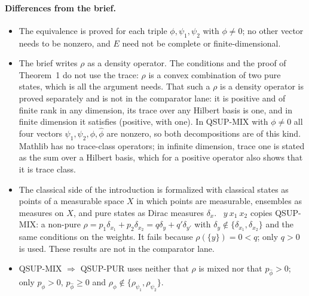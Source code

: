 \documentclass[11pt]{article}
\begin{document}
\paragraph{Differences from the brief.}
\begin{itemize}
\item The equivalence is proved for each triple $\phi, \psi_1, \psi_2$ with $\phi \ne 0$; no
  other vector needs to be nonzero, and $E$ need not be complete or finite-dimensional.
\item The brief writes $\rho$ as a density operator. The conditions and the proof of Theorem~1
  do not use the trace: $\rho$ is a convex combination of two pure states, which is all the
  argument needs. That such a $\rho$ is a density operator is proved separately and is not
  in the comparator lane: it is positive and of finite rank in any dimension, its trace over
  any Hilbert basis is one, and in finite dimension it satisfies  (positive, with
   one). In QSUP-MIX with $\phi \ne 0$ all four vectors $\psi_1, \psi_2,
  \phi, \hat\phi$ are nonzero, so both decompositions are of this kind. Mathlib has no trace-class
  operators; in infinite dimension, trace one is stated as the sum over a Hilbert basis, which
  for a positive operator also shows that it is trace class.
\item The classical side of the introduction is formalized with classical states as points of a
  measurable space $X$ in which points are measurable, ensembles as measures on $X$, and pure
  states as Dirac measures $\delta_x$. ~$y\ x_1\ x_2$ copies QSUP-MIX: a
  non-pure $\rho = p_1\delta_{x_1} + p_2\delta_{x_2} = q\delta_y + q'\delta_{y'}$ with
  $\delta_y \notin \{\delta_{x_1}, \delta_{x_2}\}$ and the same conditions on the weights.
  It fails because $\rho(\{y\}) = 0 < q$; only $q > 0$ is used. These results are not in the
  comparator lane.
\item QSUP-MIX $\Rightarrow$ QSUP-PUR uses neither that $\rho$ is mixed nor that
  $p_{\hat\phi} > 0$; only $p_\phi > 0$, $p_{\hat\phi} \ge 0$ and $\rho_\phi \notin
  \{\rho_{\psi_1}, \rho_{\psi_2}\}$.
\end{itemize}
\end{document}
